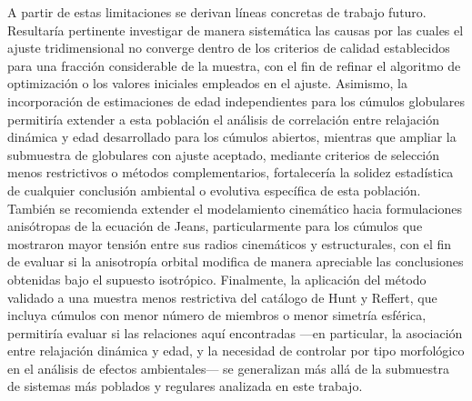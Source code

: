     A partir de estas limitaciones se derivan líneas concretas de trabajo 
    futuro. Resultaría pertinente investigar de manera sistemática las causas 
    por las cuales el ajuste tridimensional no converge dentro de los criterios 
    de calidad establecidos para una fracción considerable de la muestra, con el 
    fin de refinar el algoritmo de optimización o los valores iniciales 
    empleados en el ajuste. Asimismo, la incorporación de estimaciones de edad 
    independientes para los cúmulos globulares permitiría extender a esta 
    población el análisis de correlación entre relajación dinámica y edad 
    desarrollado para los cúmulos abiertos, mientras que ampliar la submuestra 
    de globulares con ajuste aceptado, mediante criterios de selección menos 
    restrictivos o métodos complementarios, fortalecería la solidez estadística 
    de cualquier conclusión ambiental o evolutiva específica de esta población. 
    También se recomienda extender el modelamiento cinemático hacia 
    formulaciones anisótropas de la ecuación de Jeans, particularmente para los 
    cúmulos que mostraron mayor tensión entre sus radios cinemáticos y 
    estructurales, con el fin de evaluar si la anisotropía orbital modifica de 
    manera apreciable las conclusiones obtenidas bajo el supuesto isotrópico. 
    Finalmente, la aplicación del método validado a una muestra menos 
    restrictiva del catálogo de Hunt y Reffert, que incluya cúmulos con menor 
    número de miembros o menor simetría esférica, permitiría evaluar si las 
    relaciones aquí encontradas —en particular, la asociación entre relajación 
    dinámica y edad, y la necesidad de controlar por tipo morfológico en el 
    análisis de efectos ambientales— se generalizan más allá de la submuestra de 
    sistemas más poblados y regulares analizada en este trabajo.